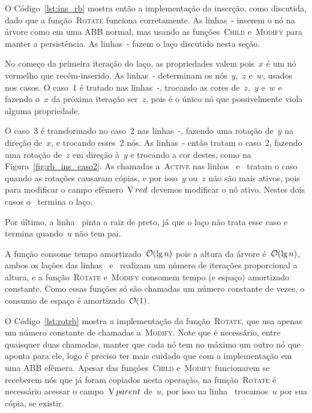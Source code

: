 \documentclass[main.tex]{subfiles}
\begin{document}
O Código~\ref{lst:ins_rb} mostra então a implementação da inserção, como discutida, dado que a função~\mbox{\textsc{Rotate}} funciona corretamente. As linhas~- inserem o nó na árvore como em uma ABB normal, mas usando as funções~\textsc{Child} e~\textsc{Modify} para manter a persistência. As linhas~- fazem o laço discutido nesta seção.

No começo da primeira iteração do laço, as propriedades valem pois~$x$ é um nó vermelho que recém-inserido. As linhas~- determinam os nós~$y$,~$z$ e~$w$, usados nos casos. O caso~1 é tratado nas linhas~-, trocando as cores de~$z$,~$y$ e~$w$ e fazendo o~$x$ da próxima iteração ser~$z$, pois é o único nó que possivelmente viola alguma propriedade.

O caso~3 é transformado no caso~2 nas linhas~-, fazendo uma rotação de~$y$ na direção de~$x$, e trocando esses~2 nós. As linhas~- então tratam o caso~2, fazendo uma rotação de~$z$ em direção à~$y$ e trocando a cor destes, como na Figura~\ref{fig:rb_ins_caso2}. As chamadas a~\textsc{Active} nas linhas~ e~ tratam o caso quando as rotações causaram cópias, e por isso~$y$ ou~$z$ não são mais ativos, pois para modificar o campo efêmero~$\operatorname{V}{red}$ devemos modificar o nó ativo. Nestes dois casos o~ termina o laço.

Por último, a linha~ pinta a raiz de preto, já que o laço não trata esse caso e termina quando~$u$ não tem pai.

A função consome tempo amortizado~$\mathcal{O}(\lg n)$ pois a altura da árvore é~$\mathcal{O}(\lg n)$, ambos os lações das linhas~ e~ realizam um número de iterações proporcional a altura, e a função~\textsc{Rotate} e~\textsc{Modify} consomem tempo (e espaço) amortizado constante. Como essas funções só são chamadas um número constante de vezes, o consumo de espaço é amortizado~$\mathcal{O}(1)$.

O Código~\ref{lst:rotrb} mostra a implementação da função~\textsc{Rotate}, que usa apenas um número constante de chamadas a~\textsc{Modify}. Note que é necessário, entre quaisquer duas chamadas, manter que cada nó tem no máximo um outro nó que aponta para ele, logo é preciso ter mais cuidado que com a implementação em uma ABB efêmera. Apesar das funções~\textsc{Child} e~\textsc{Modify} funcionarem se receberem nós que já foram copiados nesta operação, na função~\textsc{Rotate} é necessário acessar o campo~$\operatorname{V}{parent}$ de~$u$, por isso na linha~ trocamos~$u$ por sua cópia, se existir.
\end{document}
